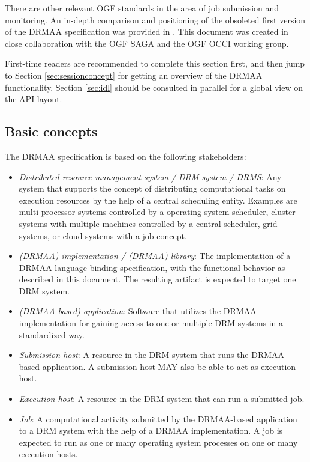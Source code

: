 \documentclass{article}
\begin{document}
There are other relevant OGF standards in the area of job submission and monitoring. An in-depth comparison and positioning of the obsoleted first version of the DRMAA \cite{gfd.133} specification was provided in \cite{drmaa09}. This document was created in close collaboration with the OGF SAGA and the OGF OCCI working group.

First-time readers are recommended to complete this section first, and then jump to Section \ref{sec:sessionconcept} for getting an overview of the DRMAA functionality. Section \ref{sec:idl} should be consulted in parallel for a global view on the API layout.

\subsection{Basic concepts}
\label{sec:concepts}

The DRMAA specification is based on the following stakeholders:

\begin{itemize}
	\item \emph{Distributed resource management system / DRM system / DRMS}: Any system that supports the concept of distributing computational tasks on execution resources by the help of a central scheduling entity. Examples are multi-processor systems controlled by a operating system scheduler, cluster systems with multiple machines controlled by a central scheduler, grid systems, or cloud systems with a job concept.  
	\item \emph{(DRMAA) implementation / (DRMAA) library}: The implementation of a DRMAA language binding specification, with the functional behavior as described in this document. The resulting artifact is expected to target one DRM system. 
	\item \emph{(DRMAA-based) application}: Software that utilizes the DRMAA implementation for gaining access to one or multiple DRM systems in a standardized way.  
	\item \emph{Submission host}: A resource in the DRM system that runs the DRMAA-based application. A submission host MAY also be able to act as execution host.
	\item \emph{Execution host}: A resource in the DRM system that can run a submitted job. 
	\item \emph{Job}: A computational activity submitted by the DRMAA-based application to a DRM system with the help of a DRMAA implementation. A job is expected to run as one or many operating system processes on one or many execution hosts. 
\end{itemize}
\end{document}
